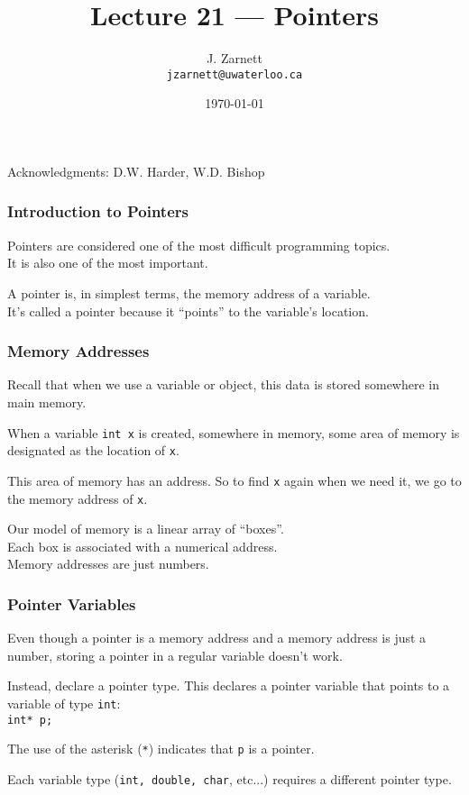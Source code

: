

\title{Lecture 21  --- Pointers }

\author{J. Zarnett\\
\texttt{jzarnett@uwaterloo.ca}}
\date{\today}



\begin{frame}
  \titlepage
  
  \begin{center}
  \small{Acknowledgments: D.W. Harder, W.D. Bishop}
  \end{center}
\end{frame}


\begin{frame}
\frametitle{Introduction to Pointers}
\alert{Pointers} are considered one of the most difficult programming topics.\\
\quad It is also one of the most important.

A pointer is, in simplest terms, the memory address of a variable.\\
\quad It's called a pointer because it ``points'' to the variable's location.

\end{frame}

\begin{frame}
\frametitle{Memory Addresses}
Recall that when we use a variable or object, this data is stored somewhere in main memory.

When a variable \texttt{int x} is created, somewhere in memory, some area of memory is designated as the location of \texttt{x}.

This area of memory has an address. So to find \texttt{x} again when we need it, we go to the memory address of \texttt{x}.

Our model of memory is a linear array of ``boxes''.\\
\quad Each box is associated with a numerical address.\\
\quad Memory addresses are just numbers.



\end{frame}

\begin{frame}
\frametitle{Pointer Variables}
Even though a pointer is a memory address and a memory address is just a number, storing a pointer in a regular variable doesn't work.

Instead, declare a pointer type. This declares a pointer variable that points to a variable of type \texttt{int}:\\
\quad \texttt{int* p;}

The use of the asterisk (\texttt{*}) indicates that \texttt{p} is a pointer.

Each variable type (\texttt{int, double, char}, etc...) requires a different pointer type.

\end{frame}

